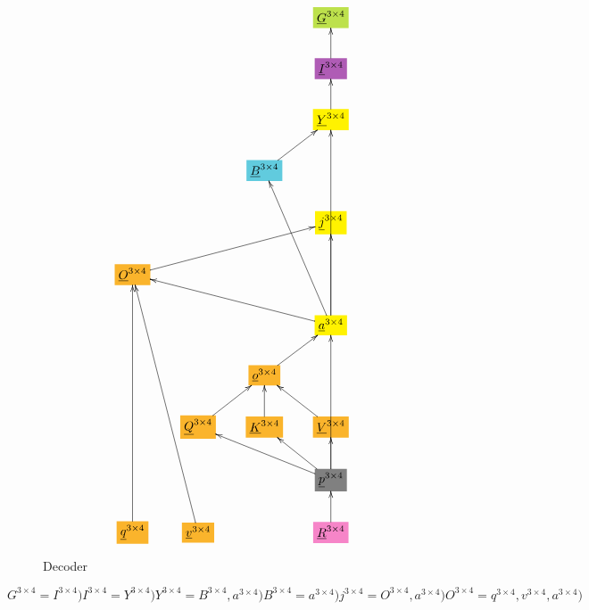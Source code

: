\documentclass[12pt]{article}
\begin{document}
\begin{figure}[h!]\centering
$$\xymatrix{
&&&*+[F*:SpringGreen]{\underline{G}^{3\times  4}}
\\
&&&*+[F*:Orchid]{\underline{I}^{3\times  4}}\ar[u]
\\
&&&*+[F*:yellow]{\underline{Y}^{3\times  4}}\ar[u]
\\
&&*+[F*:SkyBlue]{\underline{B}^{3\times  4}}\ar[ur]&
\\
&&&*+[F*:yellow]{\underline{j}^{3\times  4}}
\\
*+[F*:Dandelion]{\underline{O}^{3\times  4}}\ar[urrr]&&&
\\
&&&*+[F*:yellow]{\underline{a}^{3\times  4}}\ar[uuuu]\ar[uuul]\ar[uu]\ar[ulll]
\\
&&*+[F*:Dandelion]{\underline{o}^{3\times  4}}\ar[ur]&
\\
&*+[F*:Dandelion]{\underline{Q}^{3\times  4}}\ar[ur]&*+[F*:Dandelion]{\underline{K}^{3\times  4}}\ar[u]&*+[F*:Dandelion]{\underline{V}^{3\times  4}}\ar[ul]
\\
&&&*+[F*:gray]{\underline{p}^{3\times  4}}\ar[uuu]\ar[ull]\ar[ul]\ar[u]
\\
*+[F*:Dandelion]{\underline{q}^{3\times  4}}\ar[uuuuu]&*+[F*:Dandelion]{\underline{v}^{3\times  4}}\ar[uuuuul]&&*+[F*:Lavender]{\underline{R}^{3\times  4}}\ar[u]
}$$
\caption{Decoder}
\label{fig-texnn-for-decoder}
\end{figure}\begin{subequations}
\begin{equation}
G^{3\times  4} = I^{3\times  4})
\label{eq-G-fun-decoder}
\end{equation}

\begin{equation}
I^{3\times  4} = Y^{3\times  4})
\label{eq-I-fun-decoder}
\end{equation}

\begin{equation}
Y^{3\times  4} = B^{3\times  4},a^{3\times  4})
\label{eq-Y-fun-decoder}
\end{equation}

\begin{equation}
B^{3\times  4} = a^{3\times  4})
\label{eq-B-fun-decoder}
\end{equation}

\begin{equation}
j^{3\times  4} = O^{3\times  4},a^{3\times  4})
\label{eq-j-fun-decoder}
\end{equation}

\begin{equation}
O^{3\times  4} = q^{3\times  4},v^{3\times  4},a^{3\times  4})
\label{eq-O-fun-decoder}
\end{equation}


\end{subequations}
\end{document}
